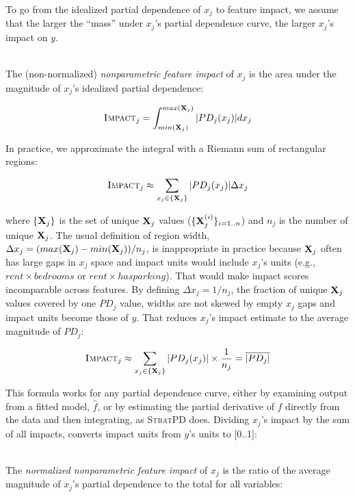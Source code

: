 \documentclass[11pt]{article}
\newcommand{\Imp}{\fontfamily{cmr}\textsc{Impact}}
\newcommand{\spd}{\fontfamily{cmr}\textsc{\small StratPD}}
\begin{document}
To go from the idealized partial dependence of $x_j$ to feature impact, we assume that the larger the ``mass'' under $x_j$'s partial dependence curve, the larger $x_j$'s impact on $y$.

~\\
 The (non-normalized) {\em nonparametric feature impact} of $x_j$ is the area under the magnitude of $x_j$'s idealized partial dependence:

\begin{equation}
\Imp_j = \int_{min({\bf X}_j)}^{max({\bf X}_j)} |PD_j(x_j)| dx_j
\end{equation}

\noindent In practice, we approximate the integral with a Riemann sum of rectangular regions:

\begin{equation}
\Imp_j \approx \sum_{x_j \in \{{\bf X}_j\}} |PD_j(x_j)| \Delta x_j
\end{equation}

\noindent  where $\{{\bf X}_j\}$ is the set of unique ${\bf X}_j$ values ($\{{\bf X}_j^{(i)}\}_{i=1..n}$) and $n_j$ is the number of unique ${\bf X}_j$. 
The usual definition of region width, $\Delta x_j = {(max({\bf X}_j) - min({\bf X}_j))}/{n_j}$, is inappropriate in practice because ${\bf X}_j$ often has large gaps in $x_j$ space and impact units would include $x_j$'s units (e.g., $rent \times bedrooms$ or $rent \times hasparking$). That would make impact scores incomparable across features. By defining $\Delta x_j = 1/n_j$, the fraction of unique ${\bf X}_j$ values covered by one $PD_j$ value, widths are not skewed by empty $x_j$ gaps and impact units become those of $y$. That reduces $x_j$'s impact estimate to the average magnitude of $PD_j$:

\[
\Imp_j \approx  \sum_{x_j \in \{{\bf X}_j\}} |PD_j(x_j)| \times \frac{1}{n_j} = \overline{|PD_j|}
\]

\noindent This formula works for any partial dependence curve, either by examining output from a fitted model, $\hat{f}$, or by estimating the partial derivative of $f$ directly from the data and then integrating, as \spd{} does. Dividing $x_j$'s impact by the sum of all impacts, converts impact units from $y$'s units to [0..1]:


~\\
 The {\em normalized nonparametric feature impact} of $x_j$ is the ratio of the average magnitude of $x_j$'s partial dependence to the total for all variables:
\end{document}
